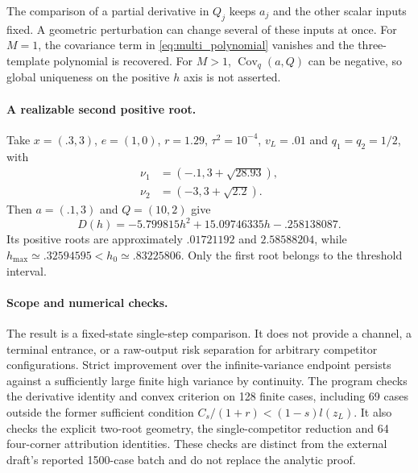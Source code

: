 The comparison of a partial derivative in $Q_j$ keeps $a_j$
and the other scalar inputs fixed. A geometric perturbation can
change several of these inputs at once.
For $M=1$, the covariance term in \eqref{eq:multi_polynomial}
vanishes and the three-template polynomial is recovered.
For $M>1$, $\operatorname{Cov}_q(a,Q)$ can be negative, so
global uniqueness on the positive $h$ axis is not asserted.

\paragraph{A realizable second positive root.}
Take $x=(.3,3)$, $e=(1,0)$, $r=1.29$,
$\tau^2=10^{-4}$, $v_L=.01$ and $q_1=q_2=1/2$, with
\begin{align*}
 \nu_1&=(-.1,3+\sqrt{28.93}),\\
 \nu_2&=(-3,3+\sqrt{2.2}).
\end{align*}
Then $a=(.1,3)$ and $Q=(10,2)$ give
\[
 D(h)=-5.799815h^2+15.09746335h-.258138087.
\]
Its positive roots are approximately $.01721192$ and $2.58588204$,
while $h_{\max}\simeq.32594595<h_0\simeq.83225806$.
Only the first root belongs to the threshold interval.

\paragraph{Scope and numerical checks.}
The result is a fixed-state single-step comparison.
It does not provide a channel, a terminal entrance, or a raw-output
risk separation for arbitrary competitor configurations.
Strict improvement over the infinite-variance endpoint persists
against a sufficiently large finite high variance by continuity.
The program 
checks the derivative identity and convex criterion on 128 finite
cases, including 69 cases outside the former sufficient condition
$C_s/(1+r)<(1-s)l(z_L)$.
It also checks the explicit two-root geometry, the single-competitor
reduction and 64 four-corner attribution identities.
These checks are distinct from the external draft's reported
1500-case batch and do not replace the analytic proof.
